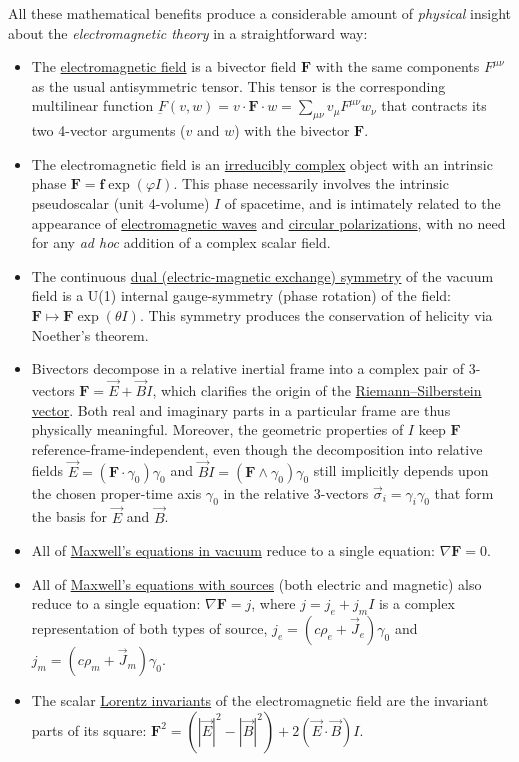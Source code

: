 \documentclass[1p,sort&compress]{elsarticle}
\numberwithin{equation}{section}
\newcommand{\rv}[1]{\vec{#1}}
\newcommand{\bv}[1]{\mathbf{#1}}
\begin{document}
All these mathematical benefits produce a considerable amount of \emph{physical} insight about the \emph{electromagnetic theory} in a straightforward way:
\begin{itemize}
  \item The \uline{electromagnetic field} is a bivector field $\bv{F}$ with the same components $F^{\mu\nu}$ as the usual antisymmetric tensor.  This tensor is the corresponding multilinear function $\underbar{F}(v,w) = v\cdot\bv{F}\cdot w = \sum_{\mu\nu} v_\mu F^{\mu\nu} w_\nu$ that contracts its two 4-vector arguments ($v$ and $w$) with the bivector $\bv{F}$. 
  \item The electromagnetic field is an \uline{irreducibly complex} object with an intrinsic phase $\bv{F} = \bv{f}\exp(\varphi I)$.  This phase necessarily involves the intrinsic pseudoscalar (unit 4-volume) $I$ of spacetime, and is intimately related to the appearance of \uline{electromagnetic waves} and \uline{circular polarizations}, with no need for any \emph{ad hoc} addition of a complex scalar field.
  \item The continuous \uline{dual (electric-magnetic exchange) symmetry} of the vacuum field is a U(1) internal gauge-symmetry (phase rotation) of the field: $\bv{F} \mapsto \bv{F}\exp(\theta I)$.  This symmetry produces the conservation of helicity via Noether's theorem.
  \item Bivectors decompose in a relative inertial frame into a complex pair of 3-vectors $\bv{F} = \rv{E} + \rv{B}I$, which clarifies the origin of the \uline{Riemann--Silberstein vector}.  Both real and imaginary parts in a particular frame are thus physically meaningful.  Moreover, the geometric properties of $I$ keep $\bv{F}$ reference-frame-independent, even though the decomposition into relative fields $\rv{E} = (\bv{F}\cdot\gamma_0)\gamma_0$ and $\rv{B}I = (\bv{F}\wedge\gamma_0)\gamma_0$ still implicitly depends upon the chosen proper-time axis $\gamma_0$ in the relative 3-vectors $\rv{\sigma}_i = \gamma_i\gamma_0$ that form the basis for $\rv{E}$ and $\rv{B}$.
  \item All of \uline{Maxwell's equations in vacuum} reduce to a single equation: $\nabla \bv{F} = 0$.
  \item All of \uline{Maxwell's equations with sources} (both electric and magnetic) also reduce to a single equation: $\nabla \bv{F} = j$, where $j = j_e + j_m I$ is a complex representation of both types of source, $j_e = (c\rho_e + \rv{J}_e)\gamma_0$ and $j_m = (c\rho_m + \rv{J}_m)\gamma_0$.
  \item The scalar \uline{Lorentz invariants} of the electromagnetic field are the invariant parts of its square: $\bv{F}^2 = (|\rv{E}|^2 - |\rv{B}|^2) + 2(\rv{E}\cdot\rv{B})I$.

\end{itemize}
\end{document}
